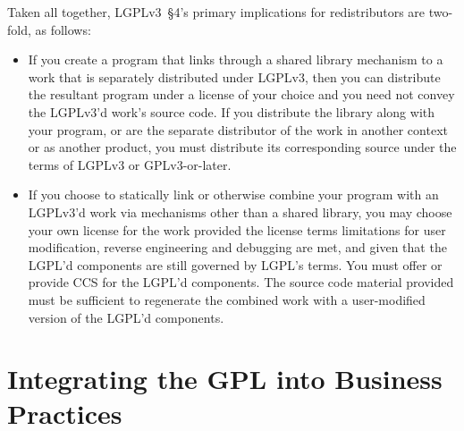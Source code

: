 Taken all together, LGPLv3~\S4's primary implications for redistributors are
two-fold, as follows:
\begin{itemize}

\item  If you create a program that links through a shared library mechanism to
    a work that is separately distributed under LGPLv3, then you can
    distribute the resultant program under a license of your choice and you
    need not convey the LGPLv3'd work's source code. If you distribute the
    library along with your program, or are the separate distributor of the
    work in another context or as another product, you must distribute its
    corresponding source under the terms of LGPLv3 or GPLv3-or-later.

\item If you choose to statically link or otherwise combine your program with
    an LGPLv3'd work via mechanisms other than a shared library, you may choose your own license for the work provided the
    license terms limitations for user modification, reverse engineering and
    debugging are met, and given that the LGPL'd components are still
    governed by LGPL's terms. You must offer or provide CCS for the LGPL'd components. The source code
    material provided must be sufficient to regenerate the combined work with
    a user-modified version of the LGPL'd components.
\end{itemize}






\chapter{Integrating the GPL into Business Practices}

